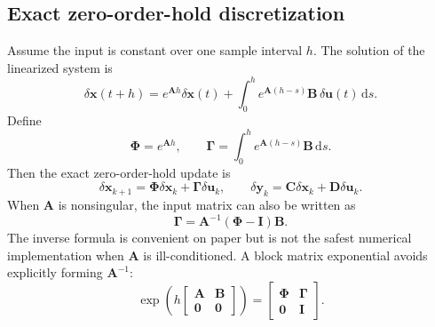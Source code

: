 \documentclass[10pt,journal]{IEEEtran}
\begin{document}
\subsection{Exact zero-order-hold discretization}
Assume the input is constant over one sample interval $h$. The solution of the linearized system is
\begin{equation}
  \delta\mathbf{x}(t+h)
  =e^{\mathbf{A}h}\delta\mathbf{x}(t)
  +\int_0^h e^{\mathbf{A}(h-s)}\mathbf{B}\,\delta\mathbf{u}(t)\,\mathrm{d}s.
\end{equation}
Define
\begin{equation}
  \boldsymbol{\Phi}=e^{\mathbf{A}h},
  \qquad
  \boldsymbol{\Gamma}=\int_0^h e^{\mathbf{A}(h-s)}\mathbf{B}\,\mathrm{d}s.
\end{equation}
Then the exact zero-order-hold update is
\begin{equation}
  \delta\mathbf{x}_{k+1}=\boldsymbol{\Phi}\delta\mathbf{x}_k
  +\boldsymbol{\Gamma}\delta\mathbf{u}_k,
  \qquad
  \delta\mathbf{y}_k=\mathbf{C}\delta\mathbf{x}_k+\mathbf{D}\delta\mathbf{u}_k.
  \label{eq:app_zoh}
\end{equation}
When $\mathbf{A}$ is nonsingular, the input matrix can also be written as
\begin{equation}
  \boldsymbol{\Gamma}=\mathbf{A}^{-1}(\boldsymbol{\Phi}-\mathbf{I})\mathbf{B}.
  \label{eq:app_gamma_inverse}
\end{equation}
The inverse formula is convenient on paper but is not the safest numerical implementation when $\mathbf{A}$ is ill-conditioned. A block matrix exponential avoids explicitly forming $\mathbf{A}^{-1}$:
\begin{equation}
  \exp\!\left(
  h\begin{bmatrix}\mathbf{A}&\mathbf{B}\\\mathbf{0}&\mathbf{0}\end{bmatrix}\right)
  =\begin{bmatrix}\boldsymbol{\Phi}&\boldsymbol{\Gamma}\\\mathbf{0}&\mathbf{I}\end{bmatrix}.
  \label{eq:app_block_exponential}
\end{equation}
\end{document}
